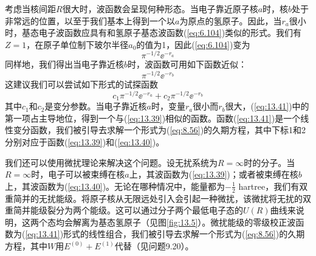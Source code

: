     考虑当核间距$R$很大时，波函数会呈现何种形态。当电子靠近原子核$a$时，核$b$处于非常远的位置，以至于我们基本上得到一个以$a$为原点的氢原子。因此，当$r_a$很小时，基态电子波函数应具有和氢原子基态波函数(\ref{eq:6.104})类似的形式。我们有$Z=1$，在原子单位制下玻尔半径$a_0$的值为1，因此(\ref{eq:6.104})变为
    \begin{equation}
        \pi^{-1/2}\ee ^{-r_a}
        \label{eq:13.39}
    \end{equation}
    同样地，我们得出当电子靠近核$b$时，波函数可用如下函数近似：
    \begin{equation}
        \pi^{-1/2}\ee ^{-r_b}
        \label{eq:13.40}
    \end{equation}
    这建议我们可以尝试如下形式的试探函数
    \begin{equation}
        c_{1}\pi^{-1/2}\ee ^{-r_{a}} + c_{2}\pi^{-1/2}\ee ^{-r_{b}}
        \label{eq:13.41}
    \end{equation}
    其中$c_{1}$和$c_{2}$是变分参数。当电子靠近核$a$时，变量$r_a$很小而$r_b$很大，(\ref{eq:13.41})中的第一项占主导地位，得到一个与(\ref{eq:13.39})相似的函数。函数(\ref{eq:13.41})是一个线性变分函数，我们被引导去求解一个形式为(\ref{eq:8.56})的久期方程，其中下标1和2分别对应于函数(\ref{eq:13.39})和(\ref{eq:13.40})。

    我们还可以使用微扰理论来解决这个问题。设无扰系统为$R = \infty$时的分子。当$R=\infty$时，电子可以被束缚在核$a$上，其波函数为(\ref{eq:13.39})；或者被束缚在核$b$上，其波函数为(\ref{eq:13.40})。无论在哪种情况中，能量都为$-\frac{1}{2}$ hartree，我们有双重简并的无扰能级。将原子核从无限远处引入会引起一种微扰，该微扰将无扰的双重简并能级裂分为两个能级。这可以通过分子两个最低电子态的$U\left(R\right)$曲线来说明，这两个态均会解离为基态氢原子（见图\ref{fig:13.5}）。微扰能级的零级校正波函数为(\ref{eq:13.41})形式的线性组合，我们被引导去求解一个形式为(\ref{eq:8.56})的久期方程，其中$W$用$E^{\left(0\right)}+E^{\left(1\right)}$代替（见问题9.20）。

